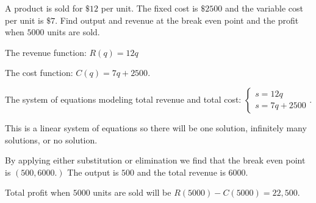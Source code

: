 \begin{example}
A product is sold for \(\$ 12\) per unit. The fixed cost is \(\$2500\) and the variable cost per unit is \(\$ 7.\) Find output and revenue at the break even point and the profit when \(5000\) units are sold.

\begin{solution}
    The revenue function: \(R(q) = 12q\)

    The cost function: \(C(q) = 7q+2500.\)

    The system of equations modeling total revenue and total cost:
    \(\begin{cases}
        s = 12q \\
        s = 7q+2500
    \end{cases}.\)

    This is a linear system of equations so there will be one solution, infinitely many solutions, or no solution.

    By applying either substitution or elimination we find that the break even point is \((500, 6000.)\) The output is \(500\) and the total revenue is \(6000.\)

    Total profit when \(5000\) units are sold will be \(R(5000) - C(5000) = 22,500.\)
\end{solution}
\end{example}